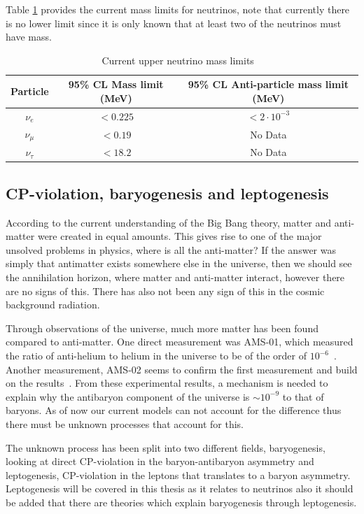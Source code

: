 Table \ref{table:UpperNMass} provides the current mass limits for neutrinos, note that currently there is no lower limit since it is only known that at least two of the neutrinos must have mass.

\begin {table}[H]
\begin{center}
\begin{tabular}{ |c|c|c| } 
 \hline
 Particle & 95\% CL Mass limit (MeV) & 95\% CL Anti-particle mass limit (MeV) \\ 
  \hline
 $\nu_e$ & $<0.225$ & $<2 \cdot 10^{-3}$ \\ 
 $\nu_\mu$ & $<0.19$ & No Data \\ 
  $\nu_\tau$ & $< 18.2$ & No Data \\ 
 \hline

\end{tabular}
\end{center}
\caption{Current upper neutrino mass limits ~\cite{13PDG}}
\label{table:UpperNMass}
\end {table}


\subsection{CP-violation, baryogenesis and leptogenesis}
According to the current understanding of the Big Bang theory, matter and anti-matter were created in equal amounts\cite{14Berry}. This gives rise to one of the major unsolved problems in physics, where is all the anti-matter? If the answer was simply that antimatter exists somewhere else in the universe, then we should see the annihilation horizon, where matter and anti-matter interact, however there are no signs of this. There has also not been any sign of this in the cosmic background radiation\cite{14Berry}.

Through observations of the universe, much more matter has been found compared to anti-matter. One direct measurement was AMS-01, which measured the ratio of anti-helium to helium in the universe to be of the order of $10^{-6}$~\cite{15AMS1}. Another measurement, AMS-02 seems to confirm the first measurement and build on the results~\cite{16AMS2}. 
From these experimental results, a mechanism is needed to explain why the antibaryon component of the universe is $\sim 10^{-9}$ to that of baryons. As of now our current models can not account for the difference thus there must be unknown processes that account for this.

The unknown process has been split into two different fields, baryogenesis, looking at direct CP-violation in the baryon-antibaryon asymmetry and leptogenesis, CP-violation in the leptons that translates to a baryon asymmetry. Leptogenesis will be covered in this thesis as it relates to neutrinos also it should be added that there are theories which explain baryogenesis through leptogenesis.

